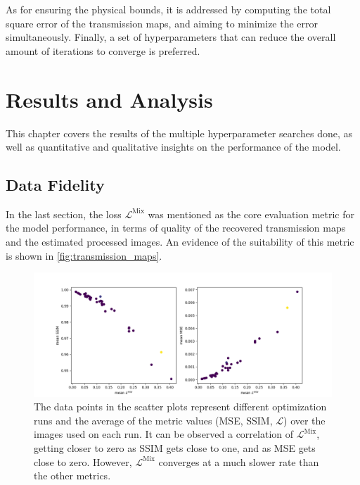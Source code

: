\documentclass[nomenclature, english, bibtex]{kththesis}
\numberwithin{listing}{chapter}
\begin{document}
As for ensuring the physical bounds, it is addressed by computing the total square error of the transmission maps,
and aiming to minimize the error simultaneously. Finally, a set of hyperparameters that can reduce the overall amount of
iterations to converge is preferred.


\chapter{Results and Analysis}
\label{ch:resultsAndAnalysis}

This chapter covers the results of the multiple hyperparameter searches done, as well as
quantitative and qualitative insights on the performance of the model.

\section{Data Fidelity}

In the last section, the loss $\mathcal{L}^{\text{Mix}}$ was mentioned as the core evaluation metric for the model performance,
in terms of quality of the recovered transmission maps and the estimated processed images. An evidence of the suitability
of this metric is shown in \autoref{fig:transmission_maps}.

\begin{figure}[ht]
    \centering
    \includegraphics[width=1.0\textwidth]{figures/L_mix.png}
    \caption{The data points in the scatter plots represent different optimization runs and the average of the metric values
    (MSE, SSIM, $\mathcal{L}$) over the images used on each run. It can be observed a correlation of $\mathcal{L}^{\text{Mix}}$,
    getting closer to zero as SSIM gets close to one, and as MSE gets close to zero. However, $\mathcal{L}^{\text{Mix}}$
    converges at a much slower rate than the other metrics.}
    \label{fig:transmission_maps}
\end{figure}
\end{document}
